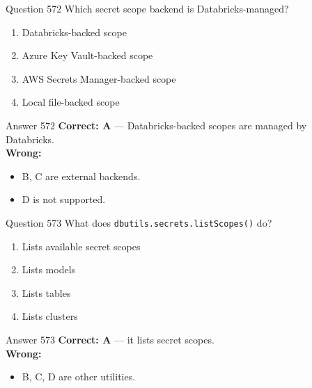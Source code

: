 \documentclass[aspectratio=169,11pt]{beamer}
\begin{document}
	\begin{frame}{Question 572}
		Which secret scope backend is Databricks-managed?
		\begin{enumerate}[label=\Alph*.]
			\item Databricks-backed scope
			\item Azure Key Vault-backed scope
			\item AWS Secrets Manager-backed scope
			\item Local file-backed scope
		\end{enumerate}
	\end{frame}
	\begin{frame}{Answer 572}
		\textbf{Correct: A} --- Databricks-backed scopes are managed by Databricks.\\
		\vspace{0.5em}
		\textbf{Wrong:}
		\begin{itemize}
			\item B, C are external backends.
			\item D is not supported.
		\end{itemize}
	\end{frame}
	
	\begin{frame}{Question 573}
		What does \texttt{dbutils.secrets.listScopes()} do?
		\begin{enumerate}[label=\Alph*.]
			\item Lists available secret scopes
			\item Lists models
			\item Lists tables
			\item Lists clusters
		\end{enumerate}
	\end{frame}
	\begin{frame}{Answer 573}
		\textbf{Correct: A} --- it lists secret scopes.\\
		\vspace{0.5em}
		\textbf{Wrong:}
		\begin{itemize}
			\item B, C, D are other utilities.
		\end{itemize}
	\end{frame}
	
\end{document}
